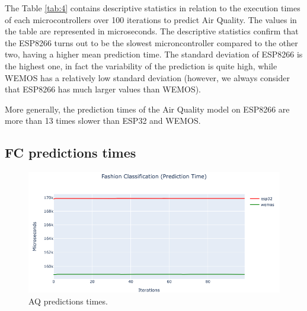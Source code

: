 \documentclass{article}
\begin{document}
The Table \ref{tab:4} contains descriptive statistics in relation to the execution times of each microcontrollers over 100 iterations to predict Air Quality. The values in the table are represented in microseconds. The descriptive statistics confirm that the ESP8266 turns out to be the slowest microncontroller compared to the other two, having a higher mean prediction time. The standard deviation of ESP8266 is the highest one, in fact the variability of the prediction is quite high, while WEMOS has a relatively low standard deviation (however, we always consider that ESP8266 has much larger values than WEMOS). 

More generally, the prediction times of the Air Quality model on ESP8266 are more than 13 times slower than ESP32 and WEMOS.

\subsection{FC predictions times}

\begin{minipage}{0.69\textwidth}
    \begin{figure}[H]
        \centering
        \includegraphics[scale=0.45]{FC-PredictionsTimes.png}
        \caption{AQ predictions times.}
        \label{fig:9}
    \end{figure}
\end{minipage}
\hfill
\begin{minipage}{0.3\textwidth}
    \begin{table}[H]
        \caption{FC descriptive statistics.}          
        \centering
        \label{tab:5}
    \end{table}
\end{minipage}
\break
\end{document}
